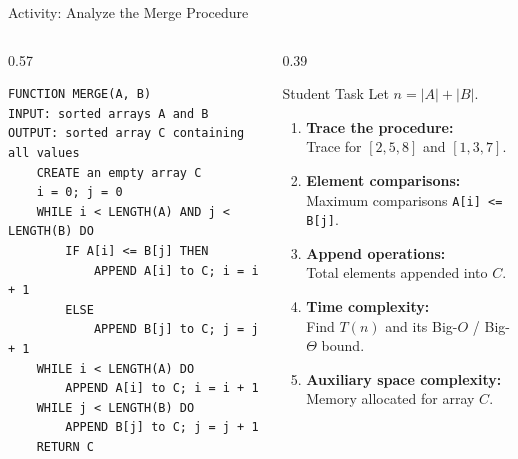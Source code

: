 \documentclass[aspectratio=169]{beamer}
\begin{document}
\begin{frame}[fragile]{Activity: Analyze the Merge Procedure}
  \scriptsize
  \begin{columns}[T]
    \begin{column}{0.57\textwidth}
\begin{lstlisting}[style=pseudonumbered,basicstyle=\ttfamily\scriptsize]
FUNCTION MERGE(A, B)
INPUT: sorted arrays A and B
OUTPUT: sorted array C containing all values
    CREATE an empty array C
    i = 0; j = 0
    WHILE i < LENGTH(A) AND j < LENGTH(B) DO
        IF A[i] <= B[j] THEN
            APPEND A[i] to C; i = i + 1
        ELSE
            APPEND B[j] to C; j = j + 1
    WHILE i < LENGTH(A) DO
        APPEND A[i] to C; i = i + 1
    WHILE j < LENGTH(B) DO
        APPEND B[j] to C; j = j + 1
    RETURN C
\end{lstlisting}
    \end{column}
    \begin{column}{0.39\textwidth}
      \begin{block}{Student Task}
        \scriptsize
        Let $n = |A| + |B|$.
        \begin{enumerate}\setlength{\itemsep}{0.25em}
          \item \textbf{Trace the procedure:}\\
            Trace for $[2, 5, 8]$ and $[1, 3, 7]$.
          \item \textbf{Element comparisons:}\\
            Maximum comparisons \texttt{A[i] <= B[j]}.
          \item \textbf{Append operations:}\\
            Total elements appended into $C$.
          \item \textbf{Time complexity:}\\
            Find $T(n)$ and its Big-$O$ / Big-$\Theta$ bound.
          \item \textbf{Auxiliary space complexity:}\\
            Memory allocated for array $C$.
        \end{enumerate}
      \end{block}
    \end{column}
  \end{columns}
\end{frame}
\end{document}
